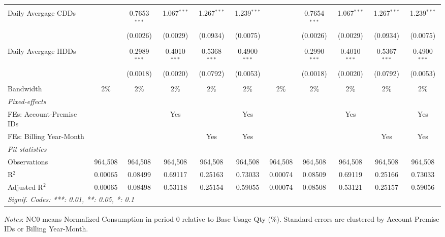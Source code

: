 \begin{table}[htbp]
\begin{adjustbox}{scale = 0.75}
\begin{tabular}{lcccccccccc}
&   &   &   &   &   &   &   &   &   &  \\
Daily Avergage CDDs&   & 0.7653$^{***}$ & 1.067$^{***}$ & 1.267$^{***}$ & 1.239$^{***}$ &    & 0.7654$^{***}$ & 1.067$^{***}$ & 1.267$^{***}$ & 1.239$^{***}$\\
  &   & (0.0026) & (0.0029) & (0.0934) & (0.0075) &    & (0.0026) & (0.0029) & (0.0934) & (0.0075)\\
&   &   &   &   &   &   &   &   &   &  \\
Daily Avergage HDDs&   & 0.2989$^{***}$ & 0.4010$^{***}$ & 0.5368$^{***}$ & 0.4900$^{***}$ &    & 0.2990$^{***}$ & 0.4010$^{***}$ & 0.5367$^{***}$ & 0.4900$^{***}$\\
  &   & (0.0018) & (0.0020) & (0.0792) & (0.0053) &    & (0.0018) & (0.0020) & (0.0792) & (0.0053)\\
&   &   &   &   &   &   &   &   &   &  \\
\midrule Bandwidth & 2\% & 2\% & 2\% & 2\% & 2\% & 2\% & 2\% & 2\% & 2\% & 2\%\\
\midrule
\emph{Fixed-effects}&   &   &   &   &   &   &   &   &   &  \\
FEs: Account-Premise IDs &  &  & Yes &  & Yes &  &  & Yes &  & Yes\\
FEs: Billing Year-Month &  &  &  & Yes & Yes &  &  &  & Yes & Yes\\
\midrule
\emph{Fit statistics}&  & & & & & & & & & \\
Observations & 964,508&964,508&964,508&964,508&964,508&964,508&964,508&964,508&964,508&964,508\\
R$^2$ & 0.00065&0.08499&0.69117&0.25163&0.73033&0.00074&0.08509&0.69119&0.25166&0.73033\\
Adjusted R$^2$ & 0.00065&0.08498&0.53118&0.25154&0.59055&0.00074&0.08508&0.53121&0.25157&0.59056\\
\bottomrule\bottomrule
\multicolumn{11}{l}{\emph{Signif. Codes: ***: 0.01, **: 0.05, *: 0.1}}\\
\end{tabular}
\end{adjustbox}
\begin{tablenotes}
\footnotesize
\emph{\medskip Notes}: NC0 means Normalized Consumption in period 0 relative to Base Usage Qty (\%). Standard errors are clustered by Account-Premise IDs or Billing Year-Month.
\end{tablenotes}
\end{table}